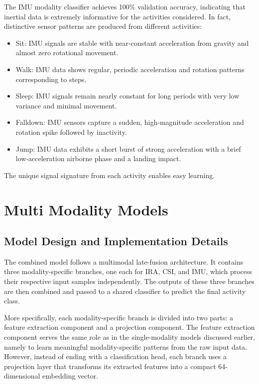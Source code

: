 The IMU modality classifier achieves 100\% validation accuracy, indicating that inertial data is extremely informative for the activities considered. In fact, distinctive sensor patterns are produced from different activities:
\begin{itemize}
    \item Sit: IMU signals are stable with near‑constant acceleration from gravity and almost zero rotational movement.
    \item Walk: IMU data shows regular, periodic acceleration and rotation patterns corresponding to steps.
    \item Sleep: IMU signals remain nearly constant for long periods with very low variance and minimal movement.
    \item Falldown: IMU sensors capture a sudden, high‑magnitude acceleration and rotation spike followed by inactivity.
    \item Jump: IMU data exhibits a short burst of strong acceleration with a brief low‑acceleration airborne phase and a landing impact.
\end{itemize}
The unique signal signature from each activity enables easy learning.

\section{Multi Modality Models}

\subsection{Model Design and Implementation Details}
The combined model follows a multimodal late-fusion architecture. It contains three modality-specific branches, one each for IRA, CSI, and IMU, which process their respective input samples independently. The outputs of these three branches are then combined and passed to a shared classifier to predict the final activity class.

More specifically, each modality-specific branch is divided into two parts: a feature extraction component and a projection component. The feature extraction component serves the same role as in the single-modality models discussed earlier, namely to learn meaningful modality-specific patterns from the raw input data. However, instead of ending with a classification head, each branch uses a projection layer that transforms its extracted features into a compact 64-dimensional embedding vector.

